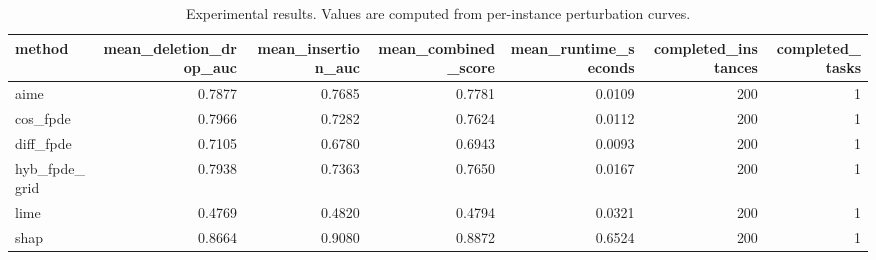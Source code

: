 \begin{table}[t]
\caption{Experimental results. Values are computed from per-instance perturbation curves.}
\label{tab:main_results_computed}
\centering
\begin{tabular}{lrrrrrr}
\toprule
method & mean\_deletion\_drop\_auc & mean\_insertion\_auc & mean\_combined\_score & mean\_runtime\_seconds & completed\_instances & completed\_tasks \\
\midrule
aime & 0.7877 & 0.7685 & 0.7781 & 0.0109 & 200 & 1 \\
cos\_fpde & 0.7966 & 0.7282 & 0.7624 & 0.0112 & 200 & 1 \\
diff\_fpde & 0.7105 & 0.6780 & 0.6943 & 0.0093 & 200 & 1 \\
hyb\_fpde\_grid & 0.7938 & 0.7363 & 0.7650 & 0.0167 & 200 & 1 \\
lime & 0.4769 & 0.4820 & 0.4794 & 0.0321 & 200 & 1 \\
shap & 0.8664 & 0.9080 & 0.8872 & 0.6524 & 200 & 1 \\
\bottomrule
\end{tabular}

\end{table}
